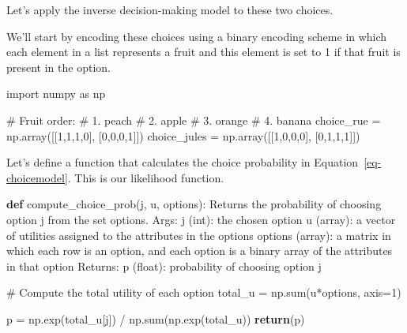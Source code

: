 \documentclass[
  letterpaper,
  DIV=11,
  numbers=noendperiod]{scrreprt}
\newenvironment{Shaded}{\begin{snugshade}}{\end{snugshade}}
\newcommand{\BuiltInTok}[1]{\textcolor[rgb]{0.00,0.23,0.31}{#1}}
\newcommand{\CommentTok}[1]{\textcolor[rgb]{0.37,0.37,0.37}{#1}}
\newcommand{\ControlFlowTok}[1]{\textcolor[rgb]{0.00,0.23,0.31}{\textbf{#1}}}
\newcommand{\DecValTok}[1]{\textcolor[rgb]{0.68,0.00,0.00}{#1}}
\newcommand{\ImportTok}[1]{\textcolor[rgb]{0.00,0.46,0.62}{#1}}
\newcommand{\KeywordTok}[1]{\textcolor[rgb]{0.00,0.23,0.31}{\textbf{#1}}}
\newcommand{\NormalTok}[1]{\textcolor[rgb]{0.00,0.23,0.31}{#1}}
\newcommand{\OperatorTok}[1]{\textcolor[rgb]{0.37,0.37,0.37}{#1}}
\begin{document}
Let's apply the inverse decision-making model to these two choices.

We'll start by encoding these choices using a binary encoding scheme in
which each element in a list represents a fruit and this element is set
to 1 if that fruit is present in the option.

\begin{Shaded}
\begin{Highlighting}[]
\ImportTok{import}\NormalTok{ numpy }\ImportTok{as}\NormalTok{ np}

\CommentTok{\# Fruit order:}
\CommentTok{\# 1. peach}
\CommentTok{\# 2. apple}
\CommentTok{\# 3. orange}
\CommentTok{\# 4. banana}
\NormalTok{choice\_rue }\OperatorTok{=}\NormalTok{ np.array([[}\DecValTok{1}\NormalTok{,}\DecValTok{1}\NormalTok{,}\DecValTok{1}\NormalTok{,}\DecValTok{0}\NormalTok{],}
\NormalTok{                       [}\DecValTok{0}\NormalTok{,}\DecValTok{0}\NormalTok{,}\DecValTok{0}\NormalTok{,}\DecValTok{1}\NormalTok{]])}
\NormalTok{choice\_jules }\OperatorTok{=}\NormalTok{ np.array([[}\DecValTok{1}\NormalTok{,}\DecValTok{0}\NormalTok{,}\DecValTok{0}\NormalTok{,}\DecValTok{0}\NormalTok{],}
\NormalTok{                         [}\DecValTok{0}\NormalTok{,}\DecValTok{1}\NormalTok{,}\DecValTok{1}\NormalTok{,}\DecValTok{1}\NormalTok{]])}
\end{Highlighting}
\end{Shaded}

Let's define a function that calculates the choice probability in
Equation~\ref{eq-choicemodel}. This is our likelihood function.

\begin{Shaded}
\begin{Highlighting}[]
\KeywordTok{def}\NormalTok{ compute\_choice\_prob(j, u, options): }
  \CommentTok{\textquotesingle{}\textquotesingle{}\textquotesingle{}}
\CommentTok{  Returns the probability of choosing option j from the set options.}
\CommentTok{     }
\CommentTok{  Args:}
\CommentTok{    j (int): the chosen option}
\CommentTok{    u (array): a vector of utilities assigned to the}
\CommentTok{      attributes in the options}
\CommentTok{    options (array): a matrix in which each row is an}
\CommentTok{      option, and each option is a binary array of the }
\CommentTok{      attributes in that option}
\CommentTok{     }
\CommentTok{  Returns:}
\CommentTok{    p (float): probability of choosing option j}
\CommentTok{  \textquotesingle{}\textquotesingle{}\textquotesingle{}}
  
  \CommentTok{\# Compute the total utility of each option}
\NormalTok{  total\_u }\OperatorTok{=}\NormalTok{ np.}\BuiltInTok{sum}\NormalTok{(u}\OperatorTok{*}\NormalTok{options, axis}\OperatorTok{=}\DecValTok{1}\NormalTok{)}
  
\NormalTok{  p }\OperatorTok{=}\NormalTok{ np.exp(total\_u[j]) }\OperatorTok{/}\NormalTok{ np.}\BuiltInTok{sum}\NormalTok{(np.exp(total\_u))}
  \ControlFlowTok{return}\NormalTok{(p)}
\end{Highlighting}
\end{Shaded}
\end{document}

